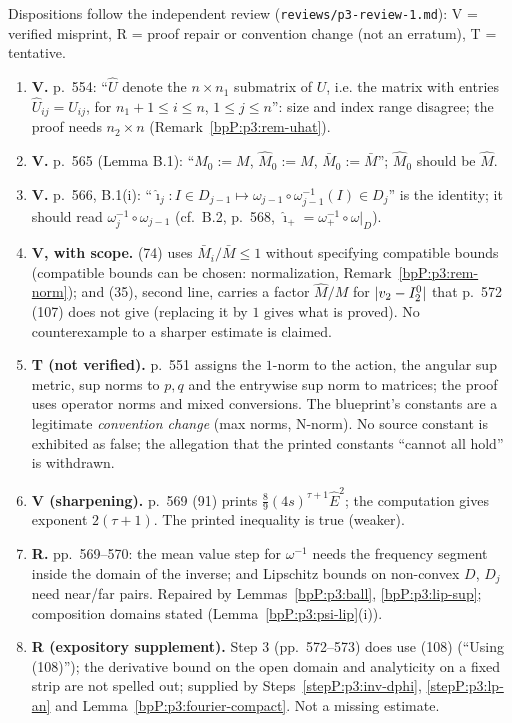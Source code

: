 Dispositions follow the independent review (\texttt{reviews/p3-review-1.md}): V = verified misprint, R = proof repair or convention change (not an erratum), T = tentative.
\begin{enumerate}[label=(E\arabic*)]
\item \textbf{V.} p.~554: ``$\hat U$ denote the $n\times n_1$ submatrix of $U$, i.e. the matrix with entries $\hat U_{ij}=U_{ij}$, for $n_1+1\le i\le n$, $1\le j\le n$'': size and index range disagree; the proof needs $n_2\times n$ (Remark~\ref{bpP:p3:rem-uhat}).
\item \textbf{V.} p.~565 (Lemma B.1): ``$M_0:=M$, $\hat M_0:=M$, $\bar M_0:=\bar M$''; $\hat M_0$ should be $\hat M$.
\item \textbf{V.} p.~566, B.1(i): ``$\hat\imath_j:I\in D_{j-1}\mapsto\omega_{j-1}\circ\omega_{j-1}^{-1}(I)\in D_j$'' is the identity; it should read $\omega_j^{-1}\circ\omega_{j-1}$ (cf.\ B.2, p.~568, $\hat\imath_+=\omega_+^{-1}\circ\omega|_D$).
\item \textbf{V, with scope.} (74) uses $\bar M_i/\bar M\le1$ without specifying compatible bounds (compatible bounds can be chosen: normalization, Remark~\ref{bpP:p3:rem-norm}); and (35), second line, carries a factor $\hat M/M$ for $\lvert v_2-I^0_2\rvert$ that p.~572 (107) does not give (replacing it by $1$ gives what is proved). No counterexample to a sharper estimate is claimed.
\item \textbf{T (not verified).} p.~551 assigns the $1$-norm to the action, the angular sup metric, sup norms to $p,q$ and the entrywise sup norm to matrices; the proof uses operator norms and mixed conversions. The blueprint's constants are a legitimate \emph{convention change} (max norms, N-norm). No source constant is exhibited as false; the allegation that the printed constants ``cannot all hold'' is withdrawn.
\item \textbf{V (sharpening).} p.~569 (91) prints $\frac89(4s)^{\tau+1}\hat E^2$; the computation gives exponent $2(\tau+1)$. The printed inequality is true (weaker).
\item \textbf{R.} pp.~569--570: the mean value step for $\omega^{-1}$ needs the frequency segment inside the domain of the inverse; and Lipschitz bounds on non-convex $D$, $D_j$ need near/far pairs. Repaired by Lemmas~\ref{bpP:p3:ball}, \ref{bpP:p3:lip-sup}; composition domains stated (Lemma~\ref{bpP:p3:psi-lip}(i)).
\item \textbf{R (expository supplement).} Step 3 (pp.~572--573) does use (108) (``Using (108)''); the derivative bound on the open domain and analyticity on a fixed strip are not spelled out; supplied by Steps~\ref{stepP:p3:inv-dphi}, \ref{stepP:p3:lp-an} and Lemma~\ref{bpP:p3:fourier-compact}. Not a missing estimate.

\end{enumerate}
